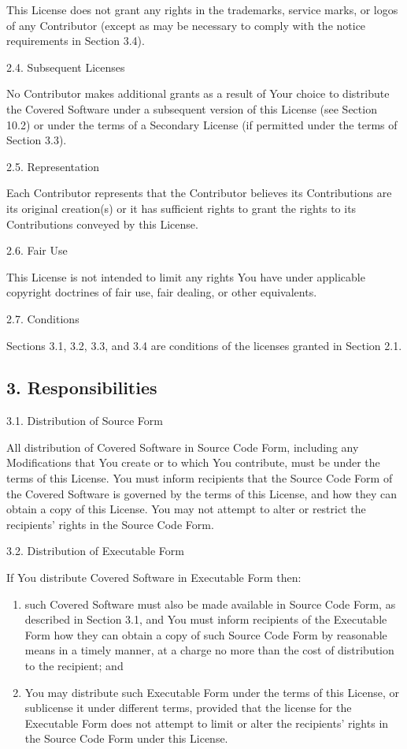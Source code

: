 \documentclass[letterpaper,10pt,openany,oneside,english]{sphinxmanual}
\begin{document}
This License does not grant any rights in the trademarks, service marks,
or logos of any Contributor (except as may be necessary to comply with
the notice requirements in Section 3.4).

2.4. Subsequent Licenses

No Contributor makes additional grants as a result of Your choice to
distribute the Covered Software under a subsequent version of this
License (see Section 10.2) or under the terms of a Secondary License (if
permitted under the terms of Section 3.3).

2.5. Representation

Each Contributor represents that the Contributor believes its
Contributions are its original creation(s) or it has sufficient rights
to grant the rights to its Contributions conveyed by this License.

2.6. Fair Use

This License is not intended to limit any rights You have under
applicable copyright doctrines of fair use, fair dealing, or other
equivalents.

2.7. Conditions

Sections 3.1, 3.2, 3.3, and 3.4 are conditions of the licenses granted
in Section 2.1.


\subsection{3. Responsibilities}
\label{\detokenize{warranty:responsibilities}}
3.1. Distribution of Source Form

All distribution of Covered Software in Source Code Form, including any
Modifications that You create or to which You contribute, must be under
the terms of this License. You must inform recipients that the Source
Code Form of the Covered Software is governed by the terms of this
License, and how they can obtain a copy of this License. You may not
attempt to alter or restrict the recipients’ rights in the Source Code
Form.

3.2. Distribution of Executable Form

If You distribute Covered Software in Executable Form then:
\begin{enumerate}
\item {} 
such Covered Software must also be made available in Source Code
Form, as described in Section 3.1, and You must inform recipients of
the Executable Form how they can obtain a copy of such Source Code
Form by reasonable means in a timely manner, at a charge no more
than the cost of distribution to the recipient; and

\item {} 
You may distribute such Executable Form under the terms of this
License, or sublicense it under different terms, provided that the
license for the Executable Form does not attempt to limit or alter
the recipients’ rights in the Source Code Form under this License.

\end{enumerate}
\end{document}
